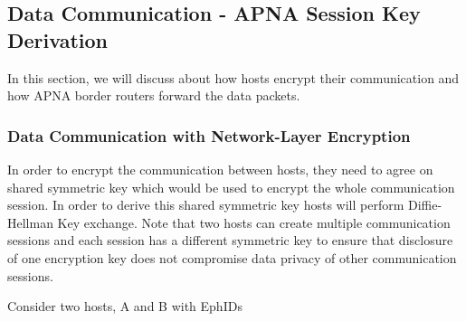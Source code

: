 \subsection{Data Communication - APNA Session Key Derivation}
In this section, we will discuss about how hosts encrypt their communication and how APNA border routers forward the data packets.

\subsubsection{Data Communication with Network-Layer Encryption}
In order to encrypt the communication between hosts, they need to agree on shared symmetric key which would be used to encrypt the whole communication session. In order to derive this shared symmetric key hosts will perform Diffie-Hellman Key exchange. Note that two hosts can create multiple communication sessions and each session has a different symmetric key to ensure that disclosure of one encryption key does not compromise data privacy of other communication sessions.

Consider two hosts, A and B with EphIDs 